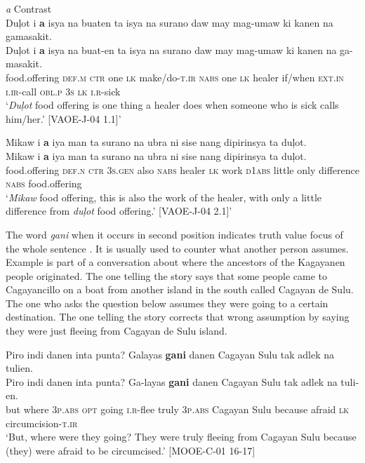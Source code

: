\ea 
\label{bkm:Ref441496729}
\textit{a} Contrast \\
Duļot  i  \textbf{a}  isya  na  buaten  ta  isya  na  surano daw  may  mag-umaw  ki  kanen  na  gamasakit. \\\smallskip
\gll Duļot  i  \textbf{a}  isya  na  buat-en  ta  isya  na  surano daw  may  mag-umaw  ki  kanen  na  ga-masakit. \\
food.offering  \textsc{def.m}  \textsc{ctr}  one  \textsc{lk}  make/do-\textsc{t.ir}  \textsc{nabs}  one  \textsc{lk}  healer
if/when  \textsc{ext.in}  \textsc{i.ir}-call  \textsc{obl.p}  \textsc{3s}  \textsc{lk}  \textsc{i.r}-sick \\
\glt `\textit{Duļot} food offering is one thing a healer does when someone who is sick calls him/her.’ [VAOE-J-04 1.1]’
\z

\ea 
\label{bkm:Ref441496733}
Mikaw  i  \textbf{a}  iya  man  ta  surano  na  ubra  ni sise  nang  dipirinsya  ta  duļot. \\\smallskip
\gll Mikaw  i  \textbf{a}  iya  man  ta  surano  na  ubra  ni sise  nang  dipirinsya  ta  duļot. \\
food.offering  \textsc{def.n}  \textsc{ctr}  3\textsc{s.gen}  also  \textsc{nabs}  healer  \textsc{lk}  work  \textsc{d1abs}
little  only  difference  \textsc{nabs}  food.offering \\
\glt `\textit{Mikaw} food offering, this is also the work of the healer, with only a little difference from \textit{duļot} food offering.’ [VAOE-J-04 2.1]’
\z

The word \textit{gani} when it occurs in second position indicates truth value focus of the whole sentence  %
. It is usually used to counter what another person assumes. Example  is part of a conversation about where the ancestors of the Kagayanen people originated. The one telling the story says that some people came to Cagayancillo on a boat from another island in the south called Cagayan de Sulu. The one who asks the question below assumes they were going to a certain destination. The one telling the story corrects that wrong assumption by saying they were just fleeing from Cagayan de Sulu island.

\ea 
\label{bkm:Ref373133996}
Piro  indi  danen  inta  punta? Galayas  \textbf{gani}  danen  Cagayan  Sulu  tak  adlek  na  tulien. \\\smallskip
\gll Piro  indi  danen  inta  punta? Ga-layas  \textbf{gani}  danen  Cagayan  Sulu  tak  adlek  na  tuli-en. \\
but  where  3\textsc{p.abs}  \textsc{opt}  going \textsc{i.r}-flee  truly  3\textsc{p.abs}  Cagayan  Sulu  because  afraid  \textsc{lk}  circumcision-\textsc{t.ir} \\
\glt ‘But, where were they going? They were truly fleeing from Cagayan Sulu because (they) were afraid to be circumcised.’ [MOOE-C-01 16-17]
\z

